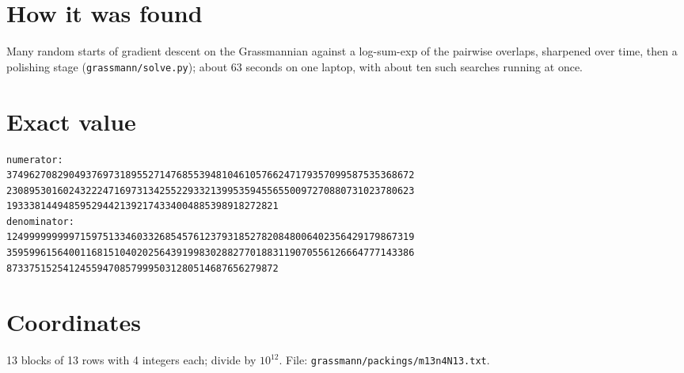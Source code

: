 \documentclass[11pt,a4paper]{article}
\begin{document}
\section{How it was found}
Many random starts of gradient descent on the Grassmannian against a log-sum-exp of the pairwise overlaps, sharpened over time, then a polishing stage (\texttt{grassmann/solve.py}); about 63 seconds on one laptop, with about ten such searches running at once.


\appendix
\section{Exact value}
{\small
\begin{verbatim}
numerator:
374962708290493769731895527147685539481046105766247179357099587535368672
230895301602432224716973134255229332139953594556550097270880731023780623
193338144948595294421392174334004885398918272821
denominator:
124999999999715975133460332685457612379318527820848006402356429179867319
359599615640011681510402025643919983028827701883119070556126664777143386
873375152541245594708579995031280514687656279872
\end{verbatim}}

\section{Coordinates}
13 blocks of 13 rows with 4 integers each; divide by $10^{12}$. File: \texttt{grassmann/packings/m13n4N13.txt}.
{\tiny
\begin{multicols}{3}
\end{multicols}}
\end{document}
